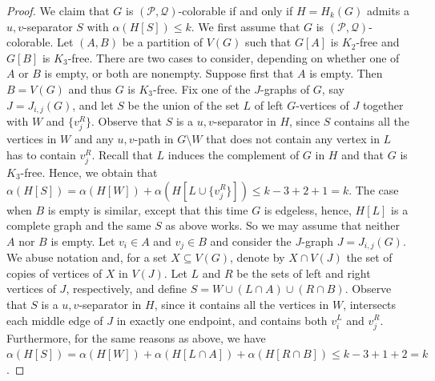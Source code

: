 \documentclass[11pt]{article}
\theoremstyle{definition}
\begin{document}
\begin{proof}
We claim that $G$ is $(\mathcal{P},\mathcal{Q})$-colorable if and only if $H = H_k(G)$ admits a $u{,}v$-separator $S$ with $\alpha(H[S]) \leq k$.
We first assume that $G$ is $(\mathcal{P},\mathcal{Q})$-colorable.
Let $(A,B)$ be a partition of $V(G)$ such that $G[A]$ is $K_2$-free and $G[B]$ is $K_3$-free.
There are two cases to consider, depending on whether one of $A$ or $B$ is empty, or both are nonempty.
Suppose first that $A$ is empty.
Then $B= V(G)$ and thus $G$ is $K_3$-free.
Fix one of the $J$-graphs of $G$, say $J = J_{i,j}(G)$, and let $S$ be the union of the set $L$ of left $G$-vertices of $J$ together with $W$ and $\{v_j^R\}$.
Observe that $S$ is a $u{,}v$-separator in $H$, since $S$ contains all the vertices in $W$ and any $u{,}v$-path in $G \setminus W$ that does not contain any vertex in $L$ has to contain $v_j^R$.
Recall that $L$ induces the complement of $G$ in $H$ and that $G$ is $K_3$-free.
Hence, we obtain that $\alpha(H[S]) = \alpha(H[W]) + \alpha(H[L \cup \{v_j^R\}]) \leq k-3+2+1 = k$.
The case when $B$ is empty is similar, except that this time $G$ is edgeless, hence, $H[L]$ is a complete graph and the same $S$ as above works.
So we may assume that neither $A$ nor $B$ is empty.
Let $v_i \in A$ and $v_j \in B$ and consider the $J$-graph $J = J_{i,j}(G)$.
We abuse notation and, for a set $X \subseteq V(G)$, denote by $X \cap V(J)$ the set of copies of vertices of $X$ in $V(J)$.
Let $L$ and $R$ be the sets of left and right vertices of $J$, respectively, and define $S = W \cup (L \cap A) \cup (R \cap B)$.
Observe that $S$ is a $u{,}v$-separator in $H$, since it contains all the vertices in $W$, intersects each middle edge of $J$ in exactly one endpoint, and contains both $v_i^L$ and $v_j^R$.
Furthermore, for the same reasons as above, we have $\alpha(H[S]) = \alpha(H[W]) + \alpha(H[L \cap A]) + \alpha(H[R \cap B]) \leq k-3 + 1 + 2 = k$.


\end{proof}
\end{document}
